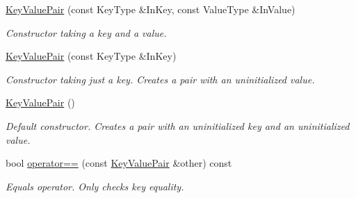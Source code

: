 \begin{DoxyCompactItemize}
\item 
\mbox{\label{struct_arcana_1_1_key_value_pair_a180f322ac6a83c57e85a9537e48f149b}} 
\mbox{\hyperlink{struct_arcana_1_1_key_value_pair_a180f322ac6a83c57e85a9537e48f149b}{Key\+Value\+Pair}} (const Key\+Type \&In\+Key, const Value\+Type \&In\+Value)
\begin{DoxyCompactList}\small\item\em Constructor taking a key and a value. \end{DoxyCompactList}\item 
\mbox{\label{struct_arcana_1_1_key_value_pair_a8d98e04c3d52554efd8734dfa966298a}} 
\mbox{\hyperlink{struct_arcana_1_1_key_value_pair_a8d98e04c3d52554efd8734dfa966298a}{Key\+Value\+Pair}} (const Key\+Type \&In\+Key)
\begin{DoxyCompactList}\small\item\em Constructor taking just a key. Creates a pair with an uninitialized value. \end{DoxyCompactList}\item 
\mbox{\label{struct_arcana_1_1_key_value_pair_a039e3a478d84fdcd72e5f50eea76eb67}} 
\mbox{\hyperlink{struct_arcana_1_1_key_value_pair_a039e3a478d84fdcd72e5f50eea76eb67}{Key\+Value\+Pair}} ()
\begin{DoxyCompactList}\small\item\em Default constructor. Creates a pair with an uninitialized key and an uninitialized value. \end{DoxyCompactList}\item 
\mbox{\label{struct_arcana_1_1_key_value_pair_a8c1603f71f89893505fde564ca3979b2}} 
bool \mbox{\hyperlink{struct_arcana_1_1_key_value_pair_a8c1603f71f89893505fde564ca3979b2}{operator==}} (const \mbox{\hyperlink{struct_arcana_1_1_key_value_pair}{Key\+Value\+Pair}} \&other) const
\begin{DoxyCompactList}\small\item\em Equals operator. Only checks key equality. \end{DoxyCompactList}\item 
\mbox{\label{struct_arcana_1_1_key_value_pair_a4998b66f9f46840ed34a38f7eac61de3}} 

\end{DoxyCompactItemize}
